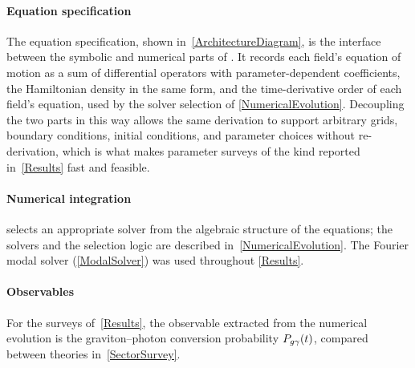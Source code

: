 \paragraph*{Equation specification}
The equation specification, shown in~\cref{ArchitectureDiagram}, is
the interface between the symbolic and numerical parts of
\TIDAL{}.
It records each field's equation of motion as a sum of differential
operators with parameter-dependent coefficients, the Hamiltonian
density in the same form, and the time-derivative order of each
field's equation, used by the solver selection of
\cref{NumericalEvolution}.
Decoupling the two parts in this way allows the same derivation to
support arbitrary grids, boundary conditions, initial conditions,
and parameter choices without re-derivation, which is what makes
parameter surveys of the kind reported in~\cref{Results} fast
and feasible.

\paragraph*{Numerical integration}
\TIDAL{} selects an appropriate solver from the algebraic structure
of the equations; the solvers and the selection logic are described
in~\cref{NumericalEvolution}.
The Fourier modal solver (\cref{ModalSolver}) was used throughout
\cref{Results}.

\paragraph*{Observables}
For the surveys of~\cref{Results}, the observable extracted from the
numerical evolution is the graviton–photon conversion probability
$P_{g\gamma}(t)$, compared between theories in~\cref{SectorSurvey}.

